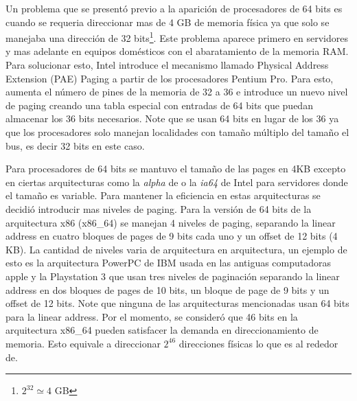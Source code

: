 Un problema que se presentó previo a la aparición de procesadores de 64 bits es
cuando se requeria direccionar mas de 4 GB de memoria física ya que solo se
manejaba una dirección de 32 bits\footnote{$2^{32}\simeq 4$ GB}. Este problema
aparece primero en servidores y mas adelante en equipos domésticos con el
abaratamiento de la memoria RAM. Para solucionar esto, Intel introduce el
mecanismo llamado Physical Address Extension (PAE) Paging a partir de los
procesadores Pentium Pro. Para esto, aumenta el número de pines de la memoria
de 32 a 36 e introduce un nuevo nivel de paging creando una tabla especial con
entradas de 64 bits que puedan almacenar los 36 bits necesarios. Note que se
usan 64 bits en lugar de los 36 ya que los procesadores solo manejan
localidades con tamaño múltiplo del tamaño el bus, es decir 32 bits en este
caso.

Para procesadores de 64 bits se mantuvo el tamaño de las pages en 4KB excepto
en ciertas arquitecturas como la \emph{alpha} de o la \emph{ia64} de Intel para
servidores donde el tamaño es variable. Para mantener la eficiencia en estas
arquitecturas se decidió introducir mas niveles de paging. Para la versión de
64 bits de la arquitectura x86 (x86\_64) se manejan 4 niveles de paging,
separando la linear address en cuatro bloques de pages de 9 bits cada uno y un
offset de 12 bits (4 KB). La cantidad de niveles varia de arquitectura en
arquitectura, un ejemplo de esto es la arquitectura PowerPC de IBM usada en las
antiguas computadoras apple y la Playstation 3 que usan tres niveles de
paginación separando la linear address en dos bloques de pages de 10 bits, un
bloque de page de 9 bits y un offset de 12 bits. Note que ninguna de las
arquitecturas mencionadas usan 64 bits para la linear address. Por el momento,
se consideró que 46 bits en la arquitectura x86\_64 pueden satisfacer la demanda
en direccionamiento de memoria. Esto equivale a direccionar $2^{46}$ direcciones
físicas lo que es al rededor de.

